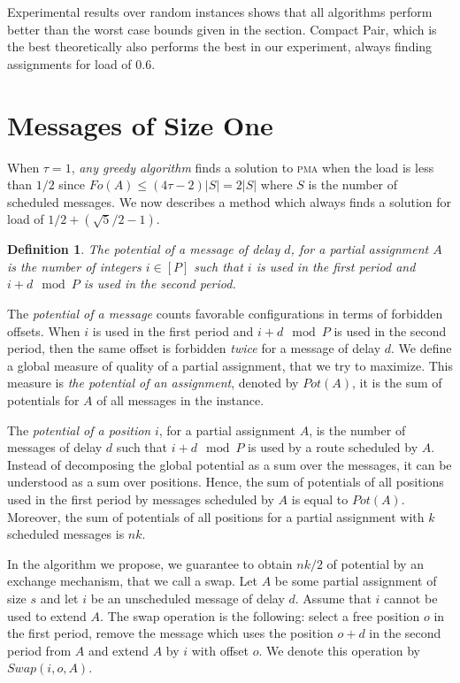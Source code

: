 \documentclass[10pt, conference, letterpaper]{algotel}
\newtheorem{definition}{Definition}
\newcommand\pma{\textsc{pma}\xspace}
\begin{document}
Experimental results over random instances shows that all algorithms perform better than the worst case bounds given in the section. Compact Pair, which is the best theoretically also performs the best in our experiment, always finding assignments for load of $0.6$. 

 \section{Messages of Size One} \label{sec:small}

When $\tau = 1$, \emph{any greedy algorithm} finds a solution to \pma when the load is less than $1/2$ since $Fo(A) \leq (4\tau -2)|S| = 2|S|$ where $S$ is the number of scheduled messages. We now describes a method which always finds a solution for load of $1/2 + (\sqrt{5}/2 -1)$.
 
\begin{definition}
The potential of a message of delay $d$, for a partial assignment $A$
is the number of integers $i \in [P]$ such that $i$ is used in the first period and $i+d \mod P$ is used in the second period.
\end{definition}

The \emph{potential of a message} counts favorable configurations in terms of forbidden offsets.
When $i$ is used in the first period and $i+d \mod P$ is used in the second period,
then the same offset is forbidden \emph{twice} for a message of delay $d$. 
We define a global measure of quality of a partial assignment, 
that we try to maximize. This measure is \emph{the potential of an assignment}, denoted by $Pot(A)$, it is the sum of potentials for $A$ of all messages in the instance.

The \emph{potential of a position} $i$, for a partial assignment $A$, is the number of messages of delay $d$ such that $i+d \mod P$ is used by a route scheduled by $A$. 
Instead of decomposing the global potential as a sum over the messages, it can be understood
as a sum over positions. Hence, the sum of potentials of all positions used in the first period by messages scheduled by $A$ is equal to $Pot(A)$.  Moreover, the sum of potentials of all positions for a partial assignment with $k$ scheduled messages is $nk$.  

In the algorithm we propose, we guarantee to obtain $nk/2$ of potential by an exchange mechanism, that we call a swap. Let $A$ be some partial assignment of size $s$ and let $i$ be an unscheduled message of delay $d$. Assume that $i$ cannot be used to extend $A$. The swap operation is the following: select a free position $o$ in the first period, remove the message which uses the position $o+d$ in the second period from $A$ and extend $A$ by $i$ with offset $o$. We denote this operation by $Swap(i,o,A)$.
\end{document}
